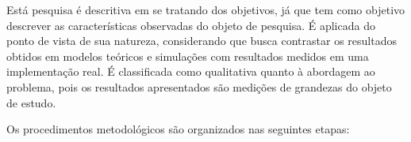 \label{Metodologia}




Está pesquisa é descritiva em se tratando dos objetivos, já que tem como objetivo descrever as características observadas do objeto de pesquisa. É aplicada do ponto de vista de sua natureza, considerando que busca contrastar os resultados obtidos em modelos teóricos e simulações com resultados medidos em uma implementação real. É classificada como qualitativa quanto à abordagem ao problema, pois os resultados apresentados são medições de grandezas do objeto de estudo.

Os procedimentos metodológicos são organizados nas seguintes etapas: 


